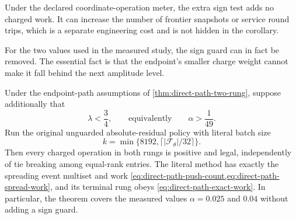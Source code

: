 Under the declared coordinate-operation meter, the extra sign test adds no
charged work. It can increase the number of frontier snapshots or service
round trips, which is a separate engineering cost and is not hidden in the
corollary.

For the two values used in the measured study, the sign guard can in fact be
removed.  The essential fact is that the endpoint's smaller charge weight
cannot make it fall behind the next amplitude level.

\begin{theorem}
\label{thm:direct-path-literal-measured-regime}
Under the endpoint-path assumptions of
\cref{thm:direct-path-two-rung}, suppose additionally that
\begin{equation}
 \lambda<\frac34,
 \qquad\text{equivalently}\qquad
 \alpha>\frac1{49}.
 \label{eq:direct-path-literal-alpha-window}
\end{equation}
Run the original unguarded absolute-residual policy with literal batch size
\begin{equation*}
 k=\min\{8192,\lceil|\mathcal F_\theta|/32\rceil\}.
\end{equation*}
Then every charged operation in both rungs is positive and legal,
independently of tie breaking among equal-rank entries.  The literal method
has exactly the spreading event multiset and work
\cref{eq:direct-path-push-count,eq:direct-path-spread-work}, and its terminal
rung obeys \cref{eq:direct-path-exact-work}.  In particular, the theorem
covers the measured values $\alpha=0.025$ and $0.04$ without adding a sign
guard.
\end{theorem}

